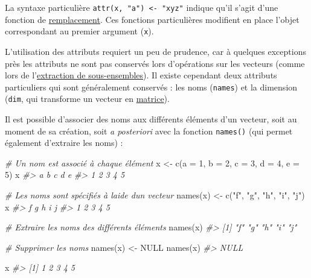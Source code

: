 \documentclass[
  french,
]{scrbook}
\newenvironment{Shaded}{\begin{snugshade}}{\end{snugshade}}
\newcommand{\AttributeTok}[1]{\textcolor[rgb]{0.77,0.63,0.00}{#1}}
\newcommand{\CommentTok}[1]{\textcolor[rgb]{0.56,0.35,0.01}{\textit{#1}}}
\newcommand{\ConstantTok}[1]{\textcolor[rgb]{0.00,0.00,0.00}{#1}}
\newcommand{\DecValTok}[1]{\textcolor[rgb]{0.00,0.00,0.81}{#1}}
\newcommand{\FunctionTok}[1]{\textcolor[rgb]{0.00,0.00,0.00}{#1}}
\newcommand{\NormalTok}[1]{#1}
\newcommand{\OtherTok}[1]{\textcolor[rgb]{0.56,0.35,0.01}{#1}}
\newcommand{\StringTok}[1]{\textcolor[rgb]{0.31,0.60,0.02}{#1}}
\begin{document}
\begin{tcolorbox}[fonttitle=\sffamily\bfseries\large,title=Remarque,colframe=darkblue]

La syntaxe particulière \texttt{attr(x,\ "a")\ \textless{}-\ "xyz"} indique qu'il s'agit d'une fonction de \protect\hyperlink{subset}{remplacement}. Ces fonctions particulières modifient en place l'objet correspondant au premier argument (\texttt{x}).

\end{tcolorbox}

L'utilisation des attributs requiert un peu de prudence, car à quelques exceptions près les attributs ne sont pas conservés lors d'opérations sur les vecteurs (comme lors de l'\protect\hyperlink{subset}{extraction de sous-ensembles}). Il existe cependant deux attributs particuliers qui sont généralement conservés : les noms (\texttt{names}) et la dimension (\texttt{dim}, qui transforme un vecteur en \protect\hyperlink{r-matrix}{matrice}).

Il est possible d'associer des noms aux différents éléments d'un vecteur, soit au moment de sa création, soit \emph{a posteriori} avec la fonction \texttt{names()} (qui permet également d'extraire les noms) :

\begin{Shaded}
\begin{Highlighting}[]
\CommentTok{\# Un nom est associé à chaque élément}
\NormalTok{x }\OtherTok{\textless{}{-}} \FunctionTok{c}\NormalTok{(}\AttributeTok{a =} \DecValTok{1}\NormalTok{, }\AttributeTok{b =} \DecValTok{2}\NormalTok{, }\AttributeTok{c =} \DecValTok{3}\NormalTok{, }\AttributeTok{d =} \DecValTok{4}\NormalTok{, }\AttributeTok{e =} \DecValTok{5}\NormalTok{)}
\NormalTok{x}
\CommentTok{\#\textgreater{} a b c d e }
\CommentTok{\#\textgreater{} 1 2 3 4 5}

\CommentTok{\# Les noms sont spécifiés à l\textquotesingle{}aide d\textquotesingle{}un vecteur}
\FunctionTok{names}\NormalTok{(x) }\OtherTok{\textless{}{-}} \FunctionTok{c}\NormalTok{(}\StringTok{"f"}\NormalTok{, }\StringTok{"g"}\NormalTok{, }\StringTok{"h"}\NormalTok{, }\StringTok{"i"}\NormalTok{, }\StringTok{"j"}\NormalTok{)}
\NormalTok{x}
\CommentTok{\#\textgreater{} f g h i j }
\CommentTok{\#\textgreater{} 1 2 3 4 5}

\CommentTok{\# Extraire les noms des différents éléments}
\FunctionTok{names}\NormalTok{(x)}
\CommentTok{\#\textgreater{} [1] "f" "g" "h" "i" "j"}

\CommentTok{\# Supprimer les noms}
\FunctionTok{names}\NormalTok{(x) }\OtherTok{\textless{}{-}} \ConstantTok{NULL}
\FunctionTok{names}\NormalTok{(x)}
\CommentTok{\#\textgreater{} NULL}

\NormalTok{x}
\CommentTok{\#\textgreater{} [1] 1 2 3 4 5}
\end{Highlighting}
\end{Shaded}
\end{document}
